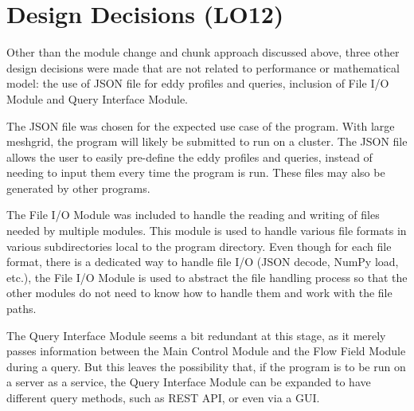 \documentclass{article}
\begin{document}

\section{Design Decisions (LO12)}

Other than the module change and chunk approach discussed above, three other design decisions were made that are not related to performance or mathematical model: the use of JSON file for eddy profiles and queries, inclusion of File I/O Module and Query Interface Module. 

The JSON file was chosen for the expected use case of the program. With large meshgrid, the program will likely be submitted to run on a cluster. The JSON file allows the user to easily pre-define the eddy profiles and queries, instead of needing to input them every time the program is run. These files may also be generated by other programs.

The File I/O Module was included to handle the reading and writing of files needed by multiple modules. This module is used to handle various file formats in various subdirectories local to the program directory. Even though for each file format, there is a dedicated way to handle file I/O (JSON decode, NumPy load, etc.), the File I/O Module is used to abstract the file handling process so that the other modules do not need to know how to handle them and work with the file paths.

The Query Interface Module seems a bit redundant at this stage, as it merely passes information between the Main Control Module and the Flow Field Module during a query. But this leaves the possibility that, if the program is to be run on a server as a service, the Query Interface Module can be expanded to have different query methods, such as REST API, or even via a GUI.



\end{document}
